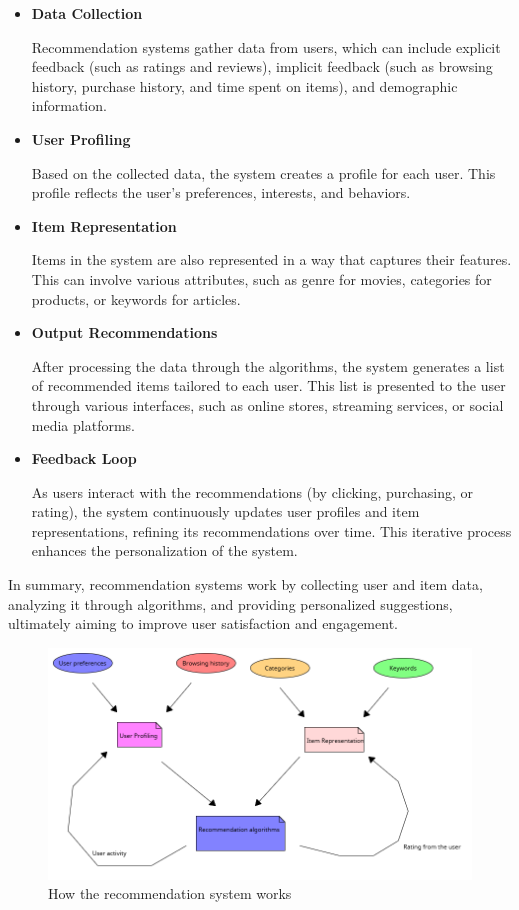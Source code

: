 \documentclass[10pt,twoside,slovak,a4paper]{article}
\begin{document}
\begin{itemize}
\newpage
\item \textbf{Data Collection}

Recommendation systems gather data from users, which can include explicit feedback (such as ratings and reviews), implicit feedback (such as browsing history, purchase history, and time spent on items), and demographic information.
\item \textbf{User Profiling}

Based on the collected data, the system creates a profile for each user. This profile reflects the user’s preferences, interests, and behaviors.
\item \textbf{Item Representation}

 Items in the system are also represented in a way that captures their features. This can involve various attributes, such as genre for movies, categories for products, or keywords for articles.
\item \textbf{Output Recommendations}

 After processing the data through the algorithms, the system generates a list of recommended items tailored to each user. This list is presented to the user through various interfaces, such as online stores, streaming services, or social media platforms.
 \item \textbf{Feedback Loop}
 
 As users interact with the recommendations (by clicking, purchasing, or rating), the system continuously updates user profiles and item representations, refining its recommendations over time. This iterative process enhances the personalization of the system.
\end{itemize}

In summary, recommendation systems work by collecting user and item data, analyzing it through algorithms, and providing personalized suggestions, ultimately aiming to improve user satisfaction and engagement.



 \begin{figure}[!h]
    \centering
    \includegraphics[width=1\linewidth]{Diagram 2.png}
    \caption{How the recommendation system works}
    \label{fig:recommendations}
\end{figure}
 
\end{document}
